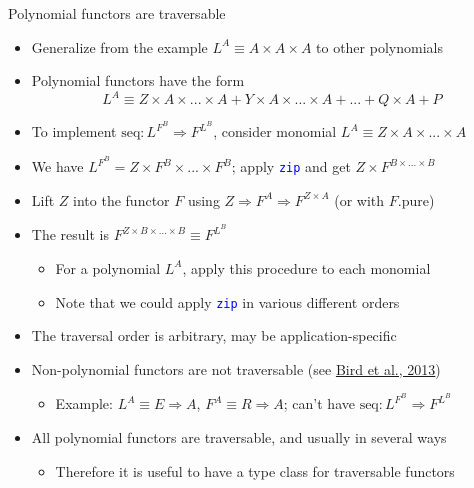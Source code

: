 \documentclass[english]{beamer}
\begin{document}
\begin{frame}{Polynomial functors are traversable}
\begin{itemize}
\item \vspace{-0.1cm}Generalize from the example $L^{A}\equiv A\times A\times A$
to other polynomials
\item Polynomial functors have the form {\small{}
\[
L^{A}\equiv Z\times A\times...\times A+Y\times A\times...\times A+...+Q\times A+P
\]
}{\small \par}
\item To implement {\small{}$\text{seq}:L^{F^{B}}\Rightarrow F^{L^{B}}$},
consider monomial {\small{}$L^{A}\equiv Z\times A\times...\times A$}{\small \par}
\item We have $L^{F^{B}}=Z\times F^{B}\times...\times F^{B}$; apply \texttt{\textcolor{blue}{\footnotesize{}zip}}
and get $Z\times F^{B\times...\times B}$ 
\item Lift $Z$ into the functor $F$ using $Z\Rightarrow F^{A}\Rightarrow F^{Z\times A}$
(or with $F.\text{pure}$)
\item The result is $F^{Z\times B\times...\times B}\equiv F^{L^{B}}$
\begin{itemize}
\item For a polynomial $L^{A}$, apply this procedure to each monomial
\item Note that we could apply \texttt{\textcolor{blue}{\footnotesize{}zip}}
in various different orders
\end{itemize}
\item The traversal order is arbitrary, may be application-specific
\item Non-polynomial functors are not traversable (see \href{http://www.cs.ox.ac.uk/jeremy.gibbons/publications/uitbaf.pdf}{Bird et al., 2013})
\begin{itemize}
\item Example: $L^{A}\equiv E\Rightarrow A$, $F^{A}\equiv R\Rightarrow A$;
can't have {\small{}$\text{seq}:L^{F^{B}}\Rightarrow F^{L^{B}}$}{\small \par}
\end{itemize}
\item All polynomial functors are traversable, and usually in several ways
\begin{itemize}
\item Therefore it is useful to have a type class for traversable functors
\end{itemize}
\end{itemize}
\end{frame}
\end{document}

